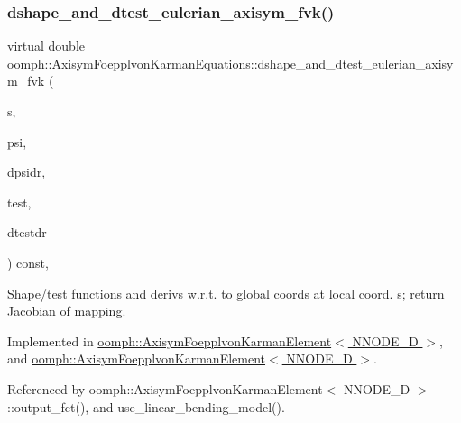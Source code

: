 \subsubsection{\texorpdfstring{dshape\+\_\+and\+\_\+dtest\+\_\+eulerian\+\_\+axisym\+\_\+fvk()}{dshape\_and\_dtest\_eulerian\_axisym\_fvk()}\hspace{0.1cm}{\footnotesize\ttfamily [2/2]}}
{\footnotesize\ttfamily virtual double oomph\+::\+Axisym\+Foepplvon\+Karman\+Equations\+::dshape\+\_\+and\+\_\+dtest\+\_\+eulerian\+\_\+axisym\+\_\+fvk (\begin{DoxyParamCaption}\item[{const \hyperlink{classoomph_1_1Vector}{Vector}$<$ double $>$ \&}]{s,  }\item[{\hyperlink{classoomph_1_1Shape}{Shape} \&}]{psi,  }\item[{\hyperlink{classoomph_1_1DShape}{D\+Shape} \&}]{dpsidr,  }\item[{\hyperlink{classoomph_1_1Shape}{Shape} \&}]{test,  }\item[{\hyperlink{classoomph_1_1DShape}{D\+Shape} \&}]{dtestdr }\end{DoxyParamCaption}) const\hspace{0.3cm}{\ttfamily [protected]}, {}}



Shape/test functions and derivs w.\+r.\+t. to global coords at local coord. s; return Jacobian of mapping. 



Implemented in \hyperlink{classoomph_1_1AxisymFoepplvonKarmanElement_a0eb2dfad7aef696dfeabb51595db46db}{oomph\+::\+Axisym\+Foepplvon\+Karman\+Element$<$ N\+N\+O\+D\+E\+\_\+D $>$}, and \hyperlink{classoomph_1_1AxisymFoepplvonKarmanElement_a0eb2dfad7aef696dfeabb51595db46db}{oomph\+::\+Axisym\+Foepplvon\+Karman\+Element$<$ N\+N\+O\+D\+E\+\_\+D $>$}.



Referenced by oomph\+::\+Axisym\+Foepplvon\+Karman\+Element$<$ N\+N\+O\+D\+E\+\_\+D $>$\+::output\+\_\+fct(), and use\+\_\+linear\+\_\+bending\+\_\+model().

\mbox{\label{classoomph_1_1AxisymFoepplvonKarmanEquations_a89a897222e4a40e2d258f4e95eb4ceeb}} 
